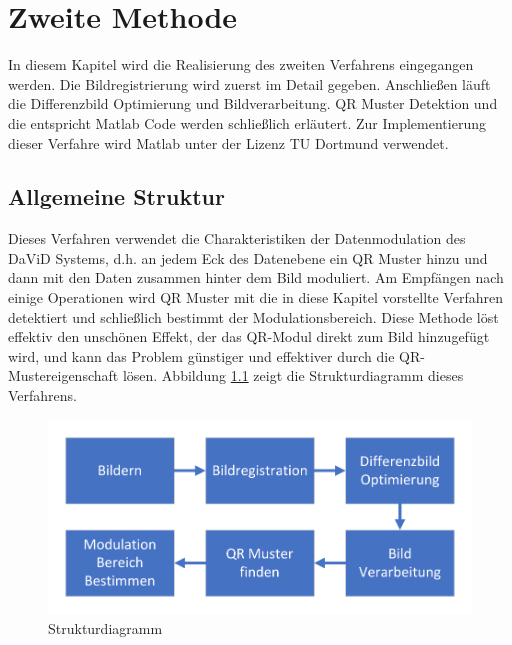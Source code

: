 \chapter{Zweite Methode} \label{cha:Zweite Methode}

In diesem Kapitel wird die Realisierung des zweiten Verfahrens eingegangen werden. Die Bildregistrierung wird zuerst im Detail gegeben. Anschließen läuft die Differenzbild Optimierung und Bildverarbeitung. QR Muster Detektion und die entspricht Matlab Code werden schließlich erläutert. 
Zur Implementierung dieser Verfahre wird Matlab unter der Lizenz TU Dortmund verwendet.

\section{Allgemeine Struktur} 

Dieses Verfahren verwendet die Charakteristiken der Datenmodulation des DaViD Systems, d.h. an jedem Eck des Datenebene ein QR Muster hinzu und dann mit den Daten zusammen hinter dem Bild moduliert. Am Empfängen nach einige Operationen   wird QR Muster mit die in diese Kapitel vorstellte Verfahren detektiert und schließlich bestimmt der Modulationsbereich. Diese Methode löst effektiv den unschönen Effekt, der das QR-Modul direkt zum Bild hinzugefügt wird, und kann das Problem günstiger und effektiver durch die QR-Mustereigenschaft lösen. Abbildung \ref{fig:Strukturdiagramm} zeigt die Strukturdiagramm dieses Verfahrens.

\begin{figure}[H]
 \centering 
 \includegraphics[keepaspectratio,width=1.0\textwidth]{images/4_ZweiteErfahrung/Strukturdiagramm.pdf}
 \caption{Strukturdiagramm}
 \label{fig:Strukturdiagramm}
\end{figure}

